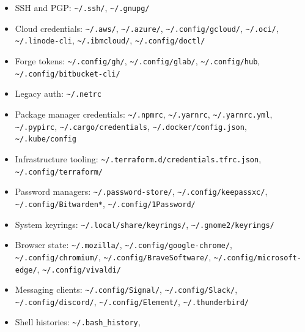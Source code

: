 \begin{itemize}
\tightlist
\item
  SSH and PGP: \texttt{\textasciitilde{}/.ssh/},
  \texttt{\textasciitilde{}/.gnupg/}
\item
  Cloud credentials: \texttt{\textasciitilde{}/.aws/},
  \texttt{\textasciitilde{}/.azure/},
  \texttt{\textasciitilde{}/.config/gcloud/},
  \texttt{\textasciitilde{}/.oci/},
  \texttt{\textasciitilde{}/.linode-cli},
  \texttt{\textasciitilde{}/.ibmcloud/},
  \texttt{\textasciitilde{}/.config/doctl/}
\item
  Forge tokens: \texttt{\textasciitilde{}/.config/gh/},
  \texttt{\textasciitilde{}/.config/glab/},
  \texttt{\textasciitilde{}/.config/hub},
  \texttt{\textasciitilde{}/.config/bitbucket-cli/}
\item
  Legacy auth: \texttt{\textasciitilde{}/.netrc}
\item
  Package manager credentials: \texttt{\textasciitilde{}/.npmrc},
  \texttt{\textasciitilde{}/.yarnrc},
  \texttt{\textasciitilde{}/.yarnrc.yml},
  \texttt{\textasciitilde{}/.pypirc},
  \texttt{\textasciitilde{}/.cargo/credentials},
  \texttt{\textasciitilde{}/.docker/config.json},
  \texttt{\textasciitilde{}/.kube/config}
\item
  Infrastructure tooling:
  \texttt{\textasciitilde{}/.terraform.d/credentials.tfrc.json},
  \texttt{\textasciitilde{}/.config/terraform/}
\item
  Password managers: \texttt{\textasciitilde{}/.password-store/},
  \texttt{\textasciitilde{}/.config/keepassxc/},
  \texttt{\textasciitilde{}/.config/Bitwarden*},
  \texttt{\textasciitilde{}/.config/1Password/}
\item
  System keyrings: \texttt{\textasciitilde{}/.local/share/keyrings/},
  \texttt{\textasciitilde{}/.gnome2/keyrings/}
\item
  Browser state: \texttt{\textasciitilde{}/.mozilla/},
  \texttt{\textasciitilde{}/.config/google-chrome/},
  \texttt{\textasciitilde{}/.config/chromium/},
  \texttt{\textasciitilde{}/.config/BraveSoftware/},
  \texttt{\textasciitilde{}/.config/microsoft-edge/},
  \texttt{\textasciitilde{}/.config/vivaldi/}
\item
  Messaging clients: \texttt{\textasciitilde{}/.config/Signal/},
  \texttt{\textasciitilde{}/.config/Slack/},
  \texttt{\textasciitilde{}/.config/discord/},
  \texttt{\textasciitilde{}/.config/Element/},
  \texttt{\textasciitilde{}/.thunderbird/}
\item
  Shell histories: \texttt{\textasciitilde{}/.bash\_history},

\end{itemize}
